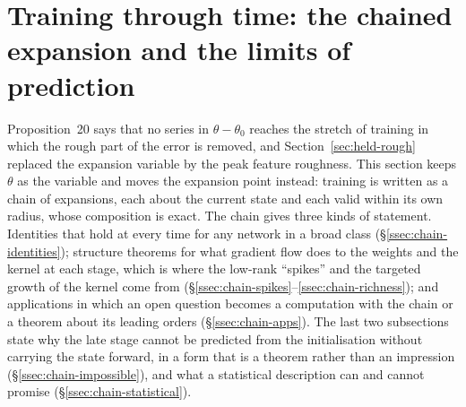 %

\section{Training through time: the chained expansion and the limits of prediction}
\label{sec:chain}

Proposition~20 says that no series in $\theta-\theta_0$ reaches the stretch of
training in which the rough part of the error is removed, and
Section~\ref{sec:held-rough} replaced the expansion variable by the peak
feature roughness. This section keeps $\theta$ as the variable and moves the
expansion point instead: training is written as a chain of expansions, each
about the current state and each valid within its own radius, whose
composition is exact. The chain gives three kinds of statement. Identities
that hold at every time for any network in a broad class (\S\ref{ssec:chain-identities});
structure theorems for what gradient flow does to the weights and the kernel
at each stage, which is where the low-rank ``spikes'' and the targeted growth
of the kernel come from (\S\ref{ssec:chain-spikes}--\ref{ssec:chain-richness});
and applications in which an open question becomes a computation with the
chain or a theorem about its leading orders (\S\ref{ssec:chain-apps}). The
last two subsections state why the late stage cannot be predicted from the
initialisation without carrying the state forward, in a form that is a
theorem rather than an impression (\S\ref{ssec:chain-impossible}), and what a
statistical description can and cannot promise (\S\ref{ssec:chain-statistical}).

